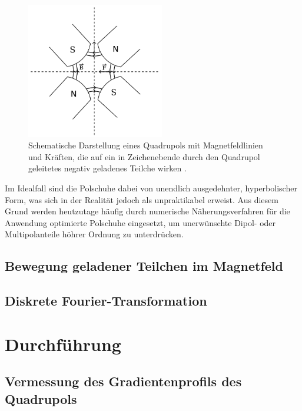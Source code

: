 \documentclass[bigchapter,colorback,accentcolor=tud4b,linedtoc,11pt]{tudreport}
\begin{document}
\begin{figure}[H]
\centering
\includegraphics[width=60mm]{img/quadrupol.png}
\caption{Schematische Darstellung eines Quadrupols mit Magnetfeldlinien und Kräften, die auf ein in Zeichenebende durch den Quadrupol geleitetes negativ geladenes Teilche wirken \cite{anleitung}.}
\end{figure}

Im Idealfall sind die Polschuhe dabei von unendlich ausgedehnter, hyperbolischer Form, was sich in der Realität jedoch als unpraktikabel erweist. Aus diesem Grund werden heutzutage häufig durch numerische Näherungsverfahren für die Anwendung optimierte Polschuhe eingesetzt, um unerwünschte Dipol- oder Multipolanteile höhrer Ordnung zu unterdrücken. 

\section{Bewegung geladener Teilchen im Magnetfeld}

\section{Diskrete Fourier-Transformation}


\chapter{Durchführung}
\section{Vermessung des Gradientenprofils des Quadrupols}
\end{document}
